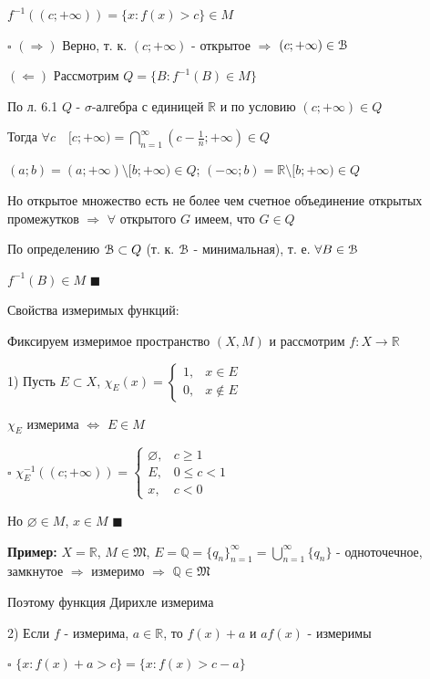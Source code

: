 \documentclass[a4paper]{report}
\begin{document}
$f^{-1}\left((c;+\infty)\right)=\{x\colon
f(x)>c\}\in M$

$\square$ $(\Rightarrow)$ Верно, т. к. $(c;+\infty)$ - открытое $\Rightarrow$ $(c;+\infty)\in\EuScript B$

$(\Leftarrow)$ Рассмотрим $Q=\{B\colon f^{-1}(B)\in M\}$

По л. 6.1 $Q$ - $\sigma$-алгебра с единицей $\mathbb R$ и по условию $(c;+\infty)\in Q$

Тогда $\forall c\quad [c;+\infty)=\bigcap\limits_{n=1}^\infty(c-\frac1n;+\infty)\in Q$

$(a;b)=(a;+\infty)\setminus[b;+\infty)\in Q$; $(-\infty;b)=\mathbb R\setminus[b;+\infty)\in Q$

Но открытое множество есть не более чем счетное объединение открытых промежутков $\Rightarrow$ $\forall$ открытого
$G$ имеем, что $G\in Q$

По определению $\EuScript B\subset Q$ (т. к. $\EuScript B$ - минимальная), т. е. $\forall B\in\EuScript B$

$f^{-1}(B)\in M$ $\blacksquare$
\bigskip

\noindent Свойства измеримых функций:

Фиксируем измеримое пространство $(X,M)$ и рассмотрим $f\colon X\to\mathbb R$

1) Пусть $E\subset X$, $\chi_E(x)=\begin{cases} 1,&x\in E\\0,&x\notin E\end{cases}$

$\chi_E$ измерима $\Leftrightarrow$ $E\in M$

\noindent $\square$ $\chi_E^{-1}\left((c;+\infty)\right)=\begin{cases}\varnothing,&c\ge1\\E,&0\le c<1\\x,&c<0\end{cases}$

Но $\varnothing\in M$, $x\in M$ $\blacksquare$
\bigskip

\noindent\textbf{Пример:} $X=\mathbb R$, $M\in\mathfrak M$, $E=\mathbb Q=\{q_n\}_{n=1}^\infty=\bigcup\limits_{n=1}^\infty
\{q_n\}$ - одноточечное, замкнутое $\Rightarrow$ измеримо $\Rightarrow$ $\mathbb Q\in\mathfrak M$

Поэтому функция Дирихле измерима
\bigskip

2) Если $f$ - измерима, $a\in\mathbb R$, то $f(x)+a$ и $af(x)$ - измеримы

\noindent $\square$ $\{x\colon f(x)+a>c\}=\{x\colon f(x)>c-a\}$
\end{document}
